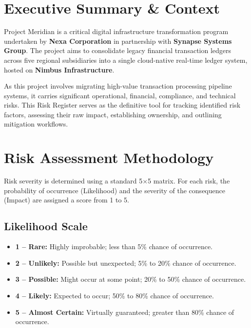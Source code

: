 \section{Executive Summary \& Context}
Project Meridian is a critical digital infrastructure transformation program undertaken by \textbf{Nexa Corporation} in partnership with \textbf{Synapse Systems Group}. The project aims to consolidate legacy financial transaction ledgers across five regional subsidiaries into a single cloud-native real-time ledger system, hosted on \textbf{Nimbus Infrastructure}. 

As this project involves migrating high-value transaction processing pipeline systems, it carries significant operational, financial, compliance, and technical risks. This Risk Register serves as the definitive tool for tracking identified risk factors, assessing their raw impact, establishing ownership, and outlining mitigation workflows.

\section{Risk Assessment Methodology}
Risk severity is determined using a standard 5$\times$5 matrix. For each risk, the probability of occurrence (Likelihood) and the severity of the consequence (Impact) are assigned a score from 1 to 5.

\subsection{Likelihood Scale}
\begin{itemize}[label=\textbullet]
  \item \textbf{1 -- Rare:} Highly improbable; less than 5\% chance of occurrence.
  \item \textbf{2 -- Unlikely:} Possible but unexpected; 5\% to 20\% chance of occurrence.
  \item \textbf{3 -- Possible:} Might occur at some point; 20\% to 50\% chance of occurrence.
  \item \textbf{4 -- Likely:} Expected to occur; 50\% to 80\% chance of occurrence.
  \item \textbf{5 -- Almost Certain:} Virtually guaranteed; greater than 80\% chance of occurrence.
\end{itemize}

